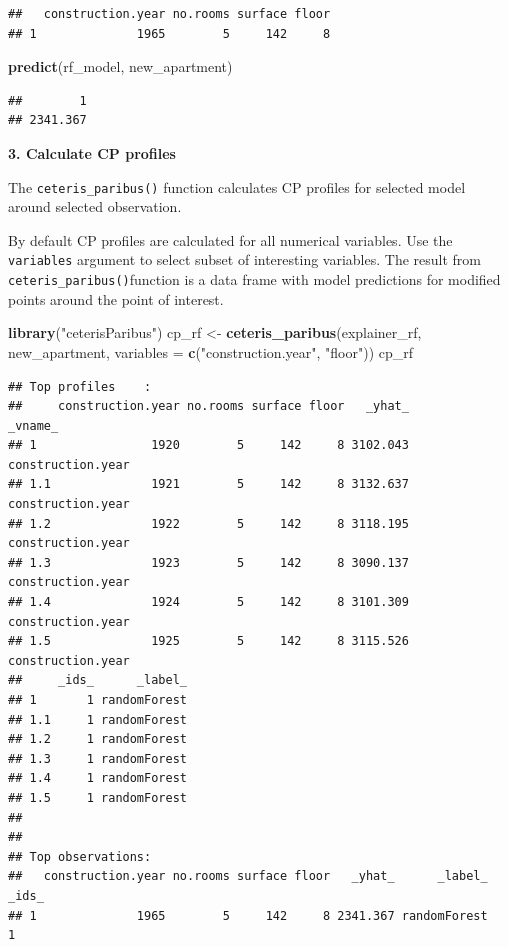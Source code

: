 \documentclass[]{krantz}
\newenvironment{Shaded}{\begin{snugshade}}{\end{snugshade}}
\newcommand{\DataTypeTok}[1]{\textcolor[rgb]{0.13,0.29,0.53}{#1}}
\newcommand{\KeywordTok}[1]{\textcolor[rgb]{0.13,0.29,0.53}{\textbf{#1}}}
\newcommand{\NormalTok}[1]{#1}
\newcommand{\StringTok}[1]{\textcolor[rgb]{0.31,0.60,0.02}{#1}}
\theoremstyle{definition}
\theoremstyle{definition}
\theoremstyle{definition}
\theoremstyle{remark}
\begin{document}
\begin{verbatim}
##   construction.year no.rooms surface floor
## 1              1965        5     142     8
\end{verbatim}

\begin{Shaded}
\begin{Highlighting}[]
\KeywordTok{predict}\NormalTok{(rf_model, new_apartment)}
\end{Highlighting}
\end{Shaded}

\begin{verbatim}
##        1 
## 2341.367
\end{verbatim}

\textbf{3. Calculate CP profiles}

The \texttt{ceteris\_paribus()} function calculates CP profiles for
selected model around selected observation.

By default CP profiles are calculated for all numerical variables. Use
the \texttt{variables} argument to select subset of interesting
variables. The result from \texttt{ceteris\_paribus()}function is a data
frame with model predictions for modified points around the point of
interest.

\begin{Shaded}
\begin{Highlighting}[]
\KeywordTok{library}\NormalTok{(}\StringTok{"ceterisParibus"}\NormalTok{)}
\NormalTok{cp_rf <-}\StringTok{ }\KeywordTok{ceteris_paribus}\NormalTok{(explainer_rf, new_apartment, }
                            \DataTypeTok{variables =} \KeywordTok{c}\NormalTok{(}\StringTok{"construction.year"}\NormalTok{, }\StringTok{"floor"}\NormalTok{))}
\NormalTok{cp_rf}
\end{Highlighting}
\end{Shaded}

\begin{verbatim}
## Top profiles    : 
##     construction.year no.rooms surface floor   _yhat_           _vname_
## 1                1920        5     142     8 3102.043 construction.year
## 1.1              1921        5     142     8 3132.637 construction.year
## 1.2              1922        5     142     8 3118.195 construction.year
## 1.3              1923        5     142     8 3090.137 construction.year
## 1.4              1924        5     142     8 3101.309 construction.year
## 1.5              1925        5     142     8 3115.526 construction.year
##     _ids_      _label_
## 1       1 randomForest
## 1.1     1 randomForest
## 1.2     1 randomForest
## 1.3     1 randomForest
## 1.4     1 randomForest
## 1.5     1 randomForest
## 
## 
## Top observations:
##   construction.year no.rooms surface floor   _yhat_      _label_ _ids_
## 1              1965        5     142     8 2341.367 randomForest     1
\end{verbatim}
\end{document}
